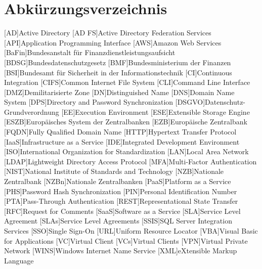 
\chapter{Abkürzungsverzeichnis}
\begin{acronym}[WHATWG ]
\setlength{\itemsep}{-\parsep}
[AD]{Active Directory}
[AD FS]{Active Directory Federation Services}
[API]{Application Programming Interface}
[AWS]{Amazon Web Services}
[BaFin]{Bundesanstalt für Finanzdienstleistungsaufsicht}
[BDSG]{Bundesdatenschutzgesetz}
[BMF]{Bundesministerium der Finanzen}
[BSI]{Bundesamt für Sicherheit in der Informationstechnik}
[CI]{Continuous Integration}
[CIFS]{Common Internet File System}
[CLI]{Command Line Interface}
[DMZ]{Demilitarisierte Zone}
[DN]{Distinguished Name}
[DNS]{Domain Name System}
[DPS]{Directory and Password Synchronization}
[DSGVO]{Datenschutz-Grundverordnung}
[EE]{Execution Environment}
[ESE]{Extensible Storage Engine}
[ESZB]{Europäisches System der Zentralbanken}
[EZB]{Europäische Zentralbank}
[FQDN]{Fully Qualified Domain Name}
[HTTP]{Hypertext Transfer Protocol}
[IaaS]{Infrastructure as a Service}
[IDE]{Integrated Development Environment}
[ISO]{International Organization for Standardization}
[LAN]{Local Area Network}
[LDAP]{Lightweight Directory Access Protocol}
[MFA]{Multi-Factor Authentication}
[NIST]{National Institute of Standards and Technology}
[NZB]{Nationale Zentralbank}
[NZBn]{Nationale Zentralbanken}
[PaaS]{Platform as a Service}
[PHS]{Password Hash Synchronization}
[PIN]{Personal Identification Number}
[PTA]{Pass-Through Authentication}
[REST]{Representational State Transfer}
[RFC]{Request for Comments}
[SaaS]{Software as a Service}
[SLA]{Service Level Agreement}
[SLAs]{Service Level Agreements}
[SSIS]{SQL Server Integration Services}
[SSO]{Single Sign-On}
[URL]{Uniform Resource Locator}
[VBA]{Visual Basic for Applications}
[VC]{Virtual Client}
[VCs]{Virtual Clients}
[VPN]{Virtual Private Network}
[WINS]{Windows Internet Name Service}
[XML]{eXtensible Markup Language}
\end{acronym}